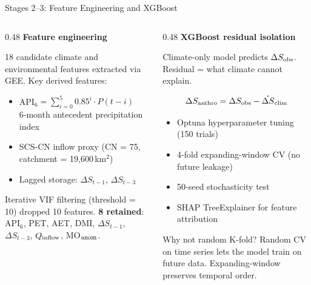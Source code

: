 \documentclass[10pt]{beamer}
\begin{document}
\begin{frame}{Stages 2--3: Feature Engineering and XGBoost}
  \begin{columns}[T]
    \begin{column}{0.48\textwidth}
      \small\textbf{Feature engineering}

      \footnotesize
      18 candidate climate and environmental features
      extracted via GEE. Key derived features:

      \begin{itemize}\footnotesize
        \item API$_6 = \sum_{i=0}^{5} 0.85^i \cdot P(t{-}i)$
              \\ 6-month antecedent precipitation index
        \item SCS-CN inflow proxy (CN = 75, catchment = 19,600\,km$^2$)
        \item Lagged storage: $\Delta S_{t-1}$, $\Delta S_{t-3}$
      \end{itemize}

      \vspace{3pt}
      Iterative VIF filtering (threshold = 10) dropped 10 features.
      \textbf{8 retained}: API$_6$, PET, AET, DMI,
      $\Delta S_{t-1}$, $\Delta S_{t-3}$, $Q_{\rm inflow}$,
      MO$_{\rm anom}$.
    \end{column}
    \begin{column}{0.48\textwidth}
      \small\textbf{XGBoost residual isolation}

      \footnotesize
      Climate-only model predicts $\Delta S_{\rm obs}$.
      Residual = what climate cannot explain.

      $$\Delta S_{\rm anthro} =
        \Delta S_{\rm obs} - \hat{\Delta S}_{\rm clim}$$

      \vspace{3pt}
      \begin{itemize}\footnotesize
        \item Optuna hyperparameter tuning (150 trials)
        \item 4-fold expanding-window CV
              (no future leakage)
        \item 50-seed stochasticity test
        \item SHAP TreeExplainer for feature attribution
      \end{itemize}

      \vspace{3pt}
      \begin{alertblock}{\small Why not random K-fold?}
        \footnotesize
        Random CV on time series lets the model
        train on future data. Expanding-window
        preserves temporal order.
      \end{alertblock}
    \end{column}
  \end{columns}
\end{frame}
\end{document}
